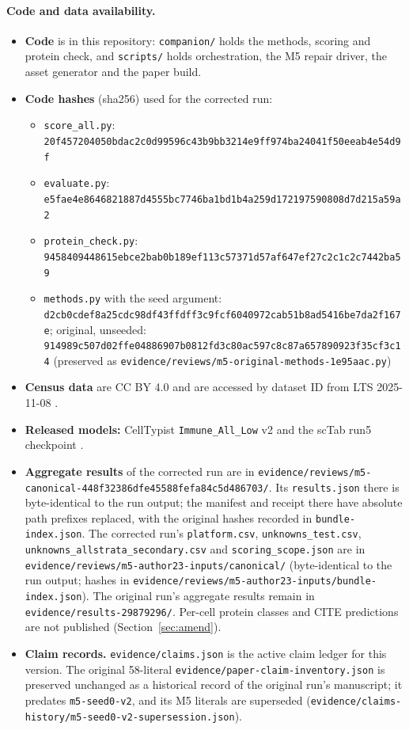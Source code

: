\documentclass[11pt]{article}
\newcommand{\code}[1]{\texttt{#1}}
\begin{document}
\paragraph{Code and data availability.}
\begin{itemize}
\item \textbf{Code} is in this repository: \texttt{companion/} holds the methods, scoring and protein check, and \texttt{scripts/} holds orchestration, the M5 repair driver, the asset generator and the paper build.
\item \textbf{Code hashes} (sha256) used for the corrected run:
\begin{itemize}
\item \nolinkurl{score_all.py}: \nolinkurl{20f457204050bdac2c0d99596c43b9bb3214e9ff974ba24041f50eeab4e54d9f}
\item \texttt{evaluate.py}: \nolinkurl{e5fae4e8646821887d4555bc7746ba1bd1b4a259d172197590808d7d215a59a2}
\item \nolinkurl{protein_check.py}: \nolinkurl{9458409448615ebce2bab0b189ef113c57371d57af647ef27c2c1c2c7442ba59}
\item \texttt{methods.py} with the seed argument: \nolinkurl{d2cb0cdef8a25cdc98df43ffdff3c9fcf6040972cab51b8ad5416be7da2f167e}; original, unseeded: \nolinkurl{914989c507d02ffe04886907b0812fd3c80ac597c8c87a657890923f35cf3c14} (preserved as \nolinkurl{evidence/reviews/m5-original-methods-1e95aac.py})
\end{itemize}
\item \textbf{Census data} are CC BY 4.0 and are accessed by dataset ID from LTS 2025-11-08 \citep{czi2025cellxgene,censusreleases}.
\item \textbf{Released models:} CellTypist \nolinkurl{Immune_All_Low} v2 \citep{celltypistmodels} and the scTab run5 checkpoint \citep{sctabrepo}.
\item \textbf{Aggregate results} of the corrected run are in \nolinkurl{evidence/reviews/m5-canonical-448f32386dfe45588fefa84c5d486703/}. Its \nolinkurl{results.json} there is byte-identical to the run output; the manifest and receipt there have absolute path prefixes replaced, with the original hashes recorded in \nolinkurl{bundle-index.json}. The corrected run's \nolinkurl{platform.csv}, \nolinkurl{unknowns_test.csv}, \nolinkurl{unknowns_allstrata_secondary.csv} and \nolinkurl{scoring_scope.json} are in \nolinkurl{evidence/reviews/m5-author23-inputs/canonical/} (byte-identical to the run output; hashes in \nolinkurl{evidence/reviews/m5-author23-inputs/bundle-index.json}). The original run's aggregate results remain in \nolinkurl{evidence/results-29879296/}. Per-cell protein classes and CITE predictions are not published (Section~\ref{sec:amend}).
\item \textbf{Claim records.} \nolinkurl{evidence/claims.json} is the active claim ledger for this version. The original 58-literal \nolinkurl{evidence/paper-claim-inventory.json} is preserved unchanged as a historical record of the original run's manuscript; it predates \code{m5-seed0-v2}, and its M5 literals are superseded (\nolinkurl{evidence/claims-history/m5-seed0-v2-supersession.json}).
\end{itemize}
\end{document}
